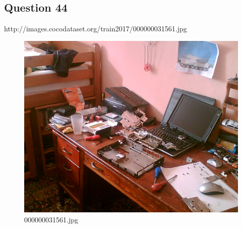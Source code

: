 \subsection*{Question 44}
http://images.cocodataset.org/train2017/000000031561.jpg
\begin{figure}[h]
    \centering
    \includegraphics[width=0.8\linewidth]{../image set/hard/000000031561.jpg}
    \caption{000000031561.jpg}
\end{figure}
